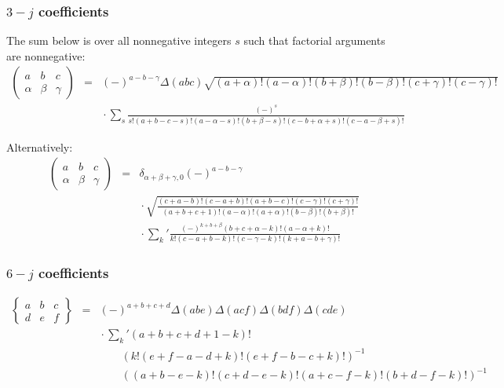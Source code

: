 \documentclass[10pt,dvipdfmx,letterpaper,twoside]{article}
\let\al=\alpha
\let\gam=\gamma
\begin{document}
\subsubsection{$3-j$ coefficients}
The sum below is over all nonnegative integers $s$ such that factorial arguments are nonnegative:
\begin{eqnarray*}
 \begin{pmatrix}a&b&c\\\al&\beta&\gam\end{pmatrix}
 &=& (-)^{a-b-\gam} \Delta(abc)\sqrt{(a+\al)!(a-\al)!(b+\beta)!(b-\beta)!(c+\gam)!(c-\gam)!} \\
 && {}\cdot\sum_s\frac{(-)^s}{s!(a+b-c-s)!(a-\al-s)!(b+\beta-s)!(c-b+\al+s)!(c-a-\beta+s)!}
\end{eqnarray*}

Alternatively: 
\begin{eqnarray*}
 \begin{pmatrix}a&b&c\\\al&\beta&\gam\end{pmatrix}
  &=& \delta_{\al+\beta+\gam,0}(-)^{a-b-\gam} \\
  && {}\cdot\sqrt{\frac{(c+a-b)!(c-a+b)!(a+b-c)!(c-\gam)!(c+\gam)!}{(a+b+c+1)!(a-\al)!(a+\al)!(b-\beta)!(b+\beta)!}} \\
  && {}\cdot{\sum_k}'\frac{(-)^{k+b+\beta}(b+c+\al-k)!(a-\al+k)!}{k!(c-a+b-k)!(c-\gam-k)!(k+a-b+\gam)!}
\end{eqnarray*}

\subsubsection{$6-j$ coefficients}
\begin{eqnarray*}
\left\{\begin{matrix}a&b&c\\d&e&f\end{matrix}\right\}
  &=& (-)^{a+b+c+d}\Delta(abe)\Delta(acf)\Delta(bdf)\Delta(cde) \\
  && {}\cdot{\sum_k}'(a+b+c+d+1-k)! \\
  && {}\qquad \left(k!(e+f-a-d+k)!(e+f-b-c+k)!\right)^{-1} \\
  && {}\qquad \left((a+b-e-k)!(c+d-e-k)!(a+c-f-k)!(b+d-f-k)!\right)^{-1}
\end{eqnarray*}

\end{document}
